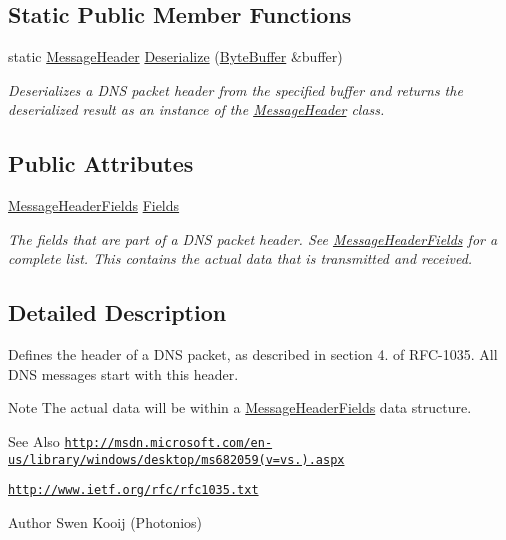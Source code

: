 \subsection*{Static Public Member Functions}
\begin{DoxyCompactItemize}
\item 
static \hyperlink{class_senergy_1_1_dns_1_1_message_header}{Message\-Header} \hyperlink{class_senergy_1_1_dns_1_1_message_header_aec3c0b3f2af0504bfa8fca6562c5b039}{Deserialize} (\hyperlink{class_senergy_1_1_byte_buffer}{Byte\-Buffer} \&buffer)
\begin{DoxyCompactList}\small\item\em Deserializes a D\-N\-S packet header from the specified buffer and returns the deserialized result as an instance of the \hyperlink{class_senergy_1_1_dns_1_1_message_header}{Message\-Header} class. \end{DoxyCompactList}\end{DoxyCompactItemize}
\subsection*{Public Attributes}
\begin{DoxyCompactItemize}
\item 
\hyperlink{struct_senergy_1_1_dns_1_1_message_header_fields}{Message\-Header\-Fields} \hyperlink{class_senergy_1_1_dns_1_1_message_header_a014c173ce2b2c5bb06ae9e5d0e201159}{Fields}
\begin{DoxyCompactList}\small\item\em The fields that are part of a D\-N\-S packet header. See \hyperlink{struct_senergy_1_1_dns_1_1_message_header_fields}{Message\-Header\-Fields} for a complete list. This contains the actual data that is transmitted and received. \end{DoxyCompactList}\end{DoxyCompactItemize}


\subsection{Detailed Description}
Defines the header of a D\-N\-S packet, as described in section 4. of R\-F\-C-\/1035. All D\-N\-S messages start with this header. 

\begin{DoxyNote}{Note}
The actual data will be within a \hyperlink{struct_senergy_1_1_dns_1_1_message_header_fields}{Message\-Header\-Fields} data structure.
\end{DoxyNote}
\begin{DoxySeeAlso}{See Also}
\href{http://msdn.microsoft.com/en-us/library/windows/desktop/ms682059(v=vs.85).aspx}{\tt http\-://msdn.\-microsoft.\-com/en-\/us/library/windows/desktop/ms682059(v=vs.).\-aspx} 

\href{http://www.ietf.org/rfc/rfc1035.txt}{\tt http\-://www.\-ietf.\-org/rfc/rfc1035.\-txt}
\end{DoxySeeAlso}
\begin{DoxyAuthor}{Author}
Swen Kooij (Photonios) 
\end{DoxyAuthor}



